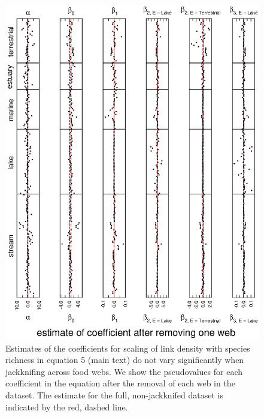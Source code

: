 \documentclass[12pt]{article}
\begin{document}
  \newpage

    \begin{figure}[!h]
    \centerline{\includegraphics*[height=.75\textheight]{Figures/Jackknife/LS_web.eps}}
    \caption{Estimates of the coefficients for scaling of link density with species richness
    in equation 5 (main text) do not vary significantly when jackknifing across food webs. 
    We show the pseudovalues for each coefficient in the equation after the removal of each 
    web in the dataset. The estimate for the full, non-jackknifed dataset is indicated by 
    the red, dashed line.}
    \label{LS_web}
    \end{figure}

  \newpage
\end{document}
